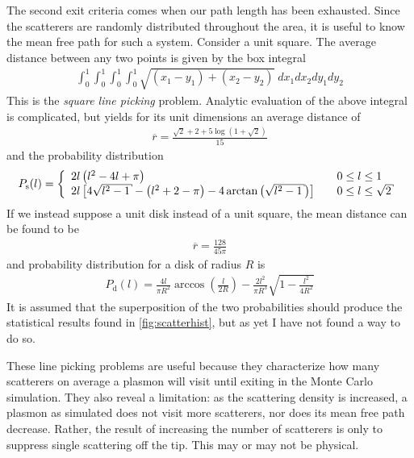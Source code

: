 The second exit criteria comes when our path length has been exhausted.
Since the scatterers are randomly distributed throughout the area, it is
useful to know the mean free path for such a system.  Consider a unit
square.  The average distance between any two points is given by the box
integral
\begin{align}
\int_0^1 \int_0^1 \int_0^1 \int_0^1 \sqrt{(x_1-y_1)+(x_2-y_2)}\; dx_1 dx_2 dy_1 dy_2
\end{align}
This is the {\it square line picking} problem.  Analytic evaluation of the
above integral is complicated, but yields for its unit dimensions an
average distance of
\begin{align}
\overline{r} = \frac{\sqrt{2}+2+5\log\left(1+\sqrt{2}\right)}{15}
\end{align}
and the probability distribution
\begin{align}
P_\mathrm{s}(l) = \left\{
\begin{array}{l l}
2l\left(l^2 -4l + \pi\right) & \quad  0\leq l \leq 1\\
2l\left[4\sqrt{l^2-1}-\left(l^2+2-\pi\right)-4\arctan\left({\sqrt{l^2-1}}\right)\right]
& \quad 0 \leq l \leq \sqrt{2}\\
\end{array}
\right.
\end{align}
If we instead suppose a unit disk instead of a unit square, the mean
distance can be found to be
\begin{align}
\overline{r}= \frac{128}{45 \pi}
\end{align}
and probability distribution for a disk of radius $R$ is
\begin{align}
P_\mathrm{d}(l)=\frac{4l}{\pi R^2} \arccos\left(\frac{l}{2R}\right) - \frac{2
l^2}{\pi R^3} \sqrt{1-\frac{l^2}{4 R^2}}
\end{align}
It is assumed that the superposition of the two probabilities should
produce the statistical results found in \ref{fig:scatterhist}, but as yet
I have not found a way to do so.

These line picking problems are useful because they characterize how many
scatterers on average a plasmon will visit until exiting in the Monte Carlo
simulation.  They also reveal a limitation: as the scattering density is
increased, a plasmon as simulated does not visit more scatterers, nor does
its mean free path decrease.  Rather, the result of increasing the number
of scatterers is only to suppress single scattering off the tip.  This may
or may not be physical. 
